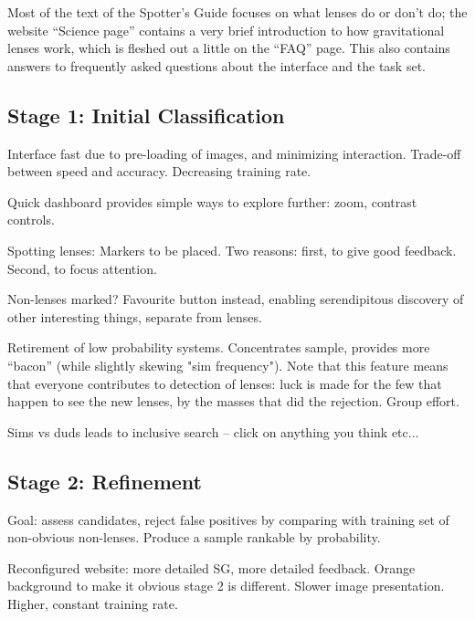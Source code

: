 \documentclass[useAMS,usenatbib,a4paper]{mn2e}
\begin{document}
Most of the text of the Spotter's Guide focuses on what lenses do or don't do;
the website ``Science page'' contains a very brief introduction to how
gravitational lenses work, which is fleshed out a little on the ``FAQ'' page. 
This also contains answers to frequently asked questions about the interface
and the task set. 


\subsection{Stage 1: Initial Classification}
\label{sec:design:stage1}

Interface fast due to pre-loading of images, and minimizing interaction.
Trade-off between speed and accuracy. Decreasing training rate.

Quick dashboard provides simple ways to explore further: zoom, contrast
controls.

Spotting lenses: Markers to be placed. Two reasons: first, to give good
feedback. Second, to focus attention.

Non-lenses marked? Favourite button instead, enabling serendipitous
discovery of other interesting things, separate from lenses.

Retirement of low probability systems. Concentrates sample, provides more
``bacon'' (while slightly skewing "sim frequency"). Note that this feature
means that everyone contributes to detection of lenses: luck is made for the
few that happen to see the new lenses, by the masses that did the rejection.
Group effort.

Sims vs duds leads to inclusive search -- click on anything you think etc...


\subsection{Stage 2: Refinement}
\label{sec:design:stage2}

Goal: assess candidates, reject false positives by comparing with training set
of non-obvious non-lenses. Produce a sample rankable by probability.

Reconfigured website: more detailed SG, more detailed feedback. Orange
background to make it obvious stage 2 is different. Slower image presentation.
Higher, constant training rate.
\end{document}
